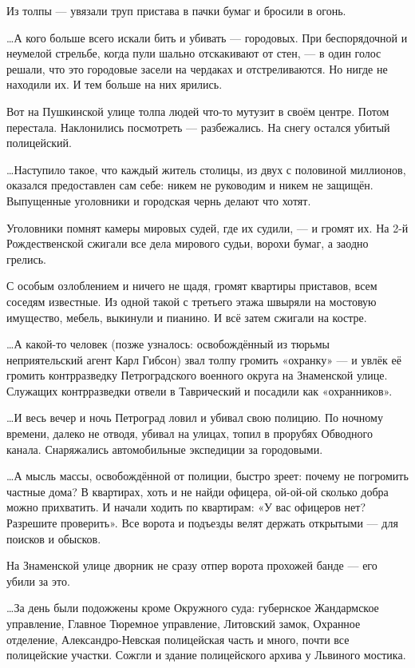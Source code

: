 Из толпы — увязали труп пристава в пачки бумаг и бросили в огонь.

…А кого больше всего искали бить и убивать — городовых. При беспорядочной и
неумелой стрельбе, когда пули шально отскакивают от стен, — в один голос
решали, что это городовые засели на чердаках и отстреливаются. Но нигде не
находили их. И тем больше на них ярились.

Вот на Пушкинской улице толпа людей что-то мутузит в своём центре. Потом
перестала. Наклонились посмотреть — разбежались. На снегу остался убитый
полицейский.

…Наступило такое, что каждый житель столицы, из двух с половиной миллионов,
оказался предоставлен сам себе: никем не руководим и никем не защищён.
Выпущенные уголовники и городская чернь делают что хотят.

Уголовники помнят камеры мировых судей, где их судили, — и громят их. На 2-й
Рождественской сжигали все дела мирового судьи, ворохи бумаг, а заодно грелись.

С особым озлоблением и ничего не щадя, громят квартиры приставов, всем соседям
известные. Из одной такой с третьего этажа швыряли на мостовую имущество,
мебель, выкинули и пианино. И всё затем сжигали на костре.

…А какой-то человек (позже узналось: освобождённый из тюрьмы неприятельский
агент Карл Гибсон) звал толпу громить «охранку» — и увлёк её громить
контрразведку Петроградского военного округа на Знаменской улице. Служащих
контрразведки отвели в Таврический и посадили как «охранников».

…И весь вечер и ночь Петроград ловил и убивал свою полицию. По ночному времени,
далеко не отводя, убивал на улицах, топил в прорубях Обводного канала.
Снаряжались автомобильные экспедиции за городовыми.

…А мысль массы, освобождённой от полиции, быстро зреет: почему не погромить
частные дома? В квартирах, хоть и не найди офицера, ой-ой-ой сколько добра
можно прихватить. И начали ходить по квартирам: «У вас офицеров нет? Разрешите
проверить». Все ворота и подъезды велят держать открытыми — для поисков и
обысков.

На Знаменской улице дворник не сразу отпер ворота прохожей банде — его убили за
это.

…За день были подожжены кроме Окружного суда: губернское Жандармское
управление, Главное Тюремное управление, Литовский замок, Охранное отделение,
Александро-Невская полицейская часть и много, почти все полицейские участки.
Сожгли и здание полицейского архива у Львиного мостика.

